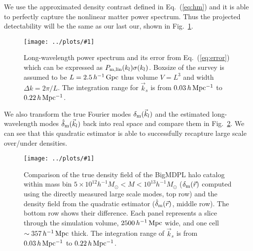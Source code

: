 \documentclass[prd,amsmath,amssymb,floatfix,superscriptaddress,nofootinbib,twocolumn]{revtex4-1}
\newcommand{\vrr}{\vec{r}}
\newcommand{\vk}{\vec{k}}
\newcommand{\ec}[1]{Eq.~(\ref{eq:#1})}
\newcommand{\rf}[1]{\ref{fig:#1}}
\newcommand{\sfig}[2]{
\texttt{[image: ../plots/\#1]}
        }
\newcommand{\Sfig}[2]{
   \begin{figure}[thbp]
   \begin{center}
    \sfig{../plots/#1.pdf}{\columnwidth}
    \caption{{\small #2}}
    \label{fig:#1}
     \end{center}
   \end{figure}
}
\begin{document}
We use the approximated density contrast defined in \ec{hm} and it is able to perfectly capture the nonlinear matter power spectrum. Thus the projected detectability will be the same as our last our, shown in Fig.~\rf{SN_BIGMDPL}.

\Sfig{SN_BIGMDPL}{Long-wavelength power spectrum and its error from \ec{error} which can be expressed as $P_{\rm m, lin}(k_l)\sigma(k_l)$. Boxsize of the survey is assumed to be $L=2.5\, h^{-1}\rm\, Gpc$ thus volume $V=L^3$ and width $\Delta k = 2\pi/L$. The integration range for $\vk_s$ is from $0.03 \,h \,\rm Mpc^{-1}$ to $0.22\,h\,\rm Mpc^{-1}$.}

We also transform the true Fourier modes $\delta_{\rm m}(\vk_l)$ and the estimated long-wavelength modes $\hat{\delta}_{\rm m}(\vk_l)$ back into real space and compare them in Fig.~\rf{real_snap}. We can see that this quadratic estimator is able to successfully recapture large scale over/under densities. 
 
\Sfig{real_snap}{Comparison of the true density field of the BigMDPL halo catalog within mass bin $5 \times 10^{12}h^{-1}M_{\odot}<M < 10^{13}h^{-1}M_{\odot}$ ($\delta_{\rm m}(\vrr)$ computed using the directly measured large scale modes, top row) and the density field from the quadratic estimator ($\hat{\delta}_{\rm m}(\vrr)$, middle row). The bottom row shows their difference. Each panel represents a slice through the simulation volume, $2500\,h^{-1}\rm \, Mpc$ wide, and one cell $\sim 357\,h^{-1}\rm \, Mpc$ thick. The integration range of $\vk_{s}$ is from $0.03\, h \rm \, Mpc^{-1}$ to $0.22\, h \rm \, Mpc^{-1}$.}
\end{document}
